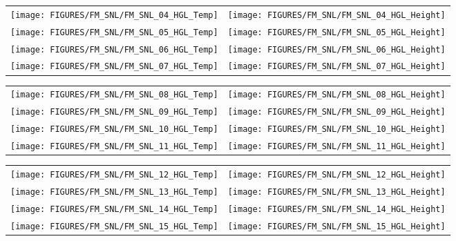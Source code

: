 \begin{figure}[p]
\begin{tabular*}{\textwidth}{l@{\extracolsep{\fill}}r}
\texttt{[image: FIGURES/FM\_SNL/FM\_SNL\_04\_HGL\_Temp]} &
\texttt{[image: FIGURES/FM\_SNL/FM\_SNL\_04\_HGL\_Height]} \\
\texttt{[image: FIGURES/FM\_SNL/FM\_SNL\_05\_HGL\_Temp]} &
\texttt{[image: FIGURES/FM\_SNL/FM\_SNL\_05\_HGL\_Height]} \\
\texttt{[image: FIGURES/FM\_SNL/FM\_SNL\_06\_HGL\_Temp]} &
\texttt{[image: FIGURES/FM\_SNL/FM\_SNL\_06\_HGL\_Height]} \\
\texttt{[image: FIGURES/FM\_SNL/FM\_SNL\_07\_HGL\_Temp]} &
\texttt{[image: FIGURES/FM\_SNL/FM\_SNL\_07\_HGL\_Height]}
\end{tabular*}
\end{figure}

\begin{figure}[p]
\begin{tabular*}{\textwidth}{l@{\extracolsep{\fill}}r}
\texttt{[image: FIGURES/FM\_SNL/FM\_SNL\_08\_HGL\_Temp]} &
\texttt{[image: FIGURES/FM\_SNL/FM\_SNL\_08\_HGL\_Height]} \\
\texttt{[image: FIGURES/FM\_SNL/FM\_SNL\_09\_HGL\_Temp]} &
\texttt{[image: FIGURES/FM\_SNL/FM\_SNL\_09\_HGL\_Height]} \\
\texttt{[image: FIGURES/FM\_SNL/FM\_SNL\_10\_HGL\_Temp]} &
\texttt{[image: FIGURES/FM\_SNL/FM\_SNL\_10\_HGL\_Height]} \\
\texttt{[image: FIGURES/FM\_SNL/FM\_SNL\_11\_HGL\_Temp]} &
\texttt{[image: FIGURES/FM\_SNL/FM\_SNL\_11\_HGL\_Height]}
\end{tabular*}
\end{figure}

\begin{figure}[p]
\begin{tabular*}{\textwidth}{l@{\extracolsep{\fill}}r}
\texttt{[image: FIGURES/FM\_SNL/FM\_SNL\_12\_HGL\_Temp]} &
\texttt{[image: FIGURES/FM\_SNL/FM\_SNL\_12\_HGL\_Height]} \\
\texttt{[image: FIGURES/FM\_SNL/FM\_SNL\_13\_HGL\_Temp]} &
\texttt{[image: FIGURES/FM\_SNL/FM\_SNL\_13\_HGL\_Height]} \\
\texttt{[image: FIGURES/FM\_SNL/FM\_SNL\_14\_HGL\_Temp]} &
\texttt{[image: FIGURES/FM\_SNL/FM\_SNL\_14\_HGL\_Height]} \\
\texttt{[image: FIGURES/FM\_SNL/FM\_SNL\_15\_HGL\_Temp]} &
\texttt{[image: FIGURES/FM\_SNL/FM\_SNL\_15\_HGL\_Height]}
\end{tabular*}
\end{figure}


